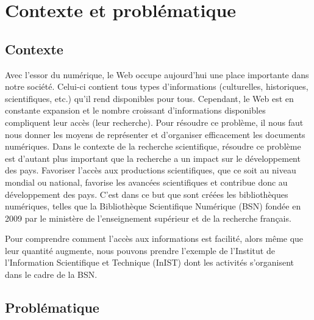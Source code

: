   \chapter{Contexte et problématique}
    \section{Contexte}
      Avec l'essor du numérique, le Web occupe aujourd'hui une place importante
      dans notre société. Celui-ci contient tous types d'informations
      (culturelles, historiques, scientifiques, etc.) qu'il rend disponibles
      pour tous. Cependant, le Web est en constante expansion et le nombre
      croissant d'informations disponibles compliquent leur accès (leur
      recherche). Pour résoudre ce problème, il nous faut nous donner les moyens
      de représenter et d'organiser efficacement les documents numériques. Dans
      le contexte de la recherche scientifique, résoudre ce problème est
      d'autant plus important que la recherche a un impact sur le développement
      des pays. Favoriser l'accès aux productions scientifiques, que ce soit au
      niveau mondial ou national, favorise les avancées scientifiques et
      contribue donc au développement des pays. C'est dans ce but que sont
      créées les bibliothèques numériques, telles que la Bibliothèque
      Scientifique Numérique (BSN) fondée en 2009 par le ministère de
      l'enseignement supérieur et de la recherche français.

      Pour comprendre comment l'accès aux informations est facilité, alors même
      que leur quantité augmente, nous pouvons prendre l'exemple de l'Institut
      de l'Information Scientifique et Technique (InIST) dont les activités
      s'organisent dans le cadre de la BSN. 




    \section{Problématique}

